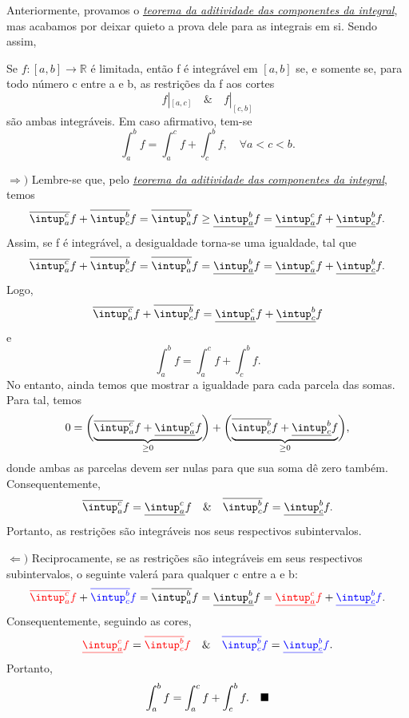 \documentclass[../analysisII_notes.tex]{subfiles}
\begin{document}
Anteriormente, provamos o \hyperlink{integral_additivity}{\textit{teorema da aditividade das componentes da integral}}, mas acabamos por deixar quieto a prova dele para as integrais em si. Sendo assim,
\begin{theorem*}
	Se \(f:[a, b]\rightarrow \mathbb{R}\) é limitada, então f é integrável em \([a, b]\) se, e somente se, para todo número c entre a e b, as restrições da f aos cortes
	\[
		f|_{[a, c]} \quad\&\quad f|_{[c, b]}
	\]
	são ambas integráveis. Em caso afirmativo, tem-se
	\[
		\int_{a}^{b} f = \int_{a}^{c} f + \int_{c}^{b}f,\quad \forall a < c < b.
	\]
\end{theorem*}
\begin{proof*}
	\(\Rightarrow )\) Lembre-se que, pelo \hyperlink{integral_additivity}{\textit{teorema da aditividade das componentes da integral}}, temos
	\[
		\overline{\intup_{a}^{c}}f + \overline{\intup_{c}^{b}}f = \overline{\intup_{a}^{b}}f \geq \underline{\intup_{a}^{b}}f = \underline{\intup_{a}^{c}}f +\underline{\intup_{c}^{b}}f.
	\]
	Assim, se f é integrável, a desigualdade torna-se uma igualdade, tal que
	\[
		\overline{\intup_{a}^{c}}f + \overline{\intup_{c}^{b}}f = \overline{\intup_{a}^{b}}f = \underline{\intup_{a}^{b}}f = \underline{\intup_{a}^{c}}f +\underline{\intup_{c}^{b}}f.
	\]
	Logo,
	\[
		\overline{\intup_{a}^{c}}f + \overline{\intup_{c}^{b}}f = \underline{\intup_{a}^{c}}f +\underline{\intup_{c}^{b}}f
	\]
	e
	\[
		\int_{a}^{b} f = \int_{a}^{c} f + \int_{c}^{b} f.
	\]
	No entanto, ainda temos que mostrar a igualdade para cada parcela das somas. Para tal, temos
	\[
		0 = \biggl(\underbrace{\overline{\intup_{a}^{c}}f + \underline{\intup_{a}^{c}}f}_{\geq 0}\biggr) + \biggl(\underbrace{\overline{\intup_{c}^{b}}f + \underline{\intup_{c}^{b}} f}_{\geq 0}\biggr),
	\]
	donde ambas as parcelas devem ser nulas para que sua soma dê zero também. Consequentemente,
	\[
		\overline{\intup_{a}^{c}} f = \underline{\intup_{a}^{c}} f \quad\&\quad \overline{\intup_{c}^{b}}f = \underline{\intup_{c}^{b}}f.
	\]
	Portanto, as restrições são integráveis nos seus respectivos subintervalos.

	\(\Leftarrow )\) Reciprocamente, se as restrições são integráveis em seus respectivos subintervalos, o seguinte valerá para qualquer c entre a e b:
	\[
		{\color{red}\overline{\intup_{a}^{c}}f} + {\color{blue}\overline{\intup_{c}^{b}}f} = \overline{\intup_{a}^{b}}f =\underline{\intup_{a}^{b}}f = {\color{red}\underline{\intup_{a}^{c}}f} +{\color{blue} \underline{\intup_{c}^{b}}f}.
	\]
	Consequentemente, seguindo as cores,
	\[
		{\color{red}\underline{\intup_{a}^{c}}f} = {\color{red}\overline{\intup_{c}^{b}}f} \quad\&\quad {\color{blue}\overline{\intup_{c}^{b}}f} = {\color{blue}\underline{\intup_{c}^{b}}f}.
	\]
	Portanto,
	\[
		\int_{a}^{b}f = \int_{a}^{c} f + \int_{c}^{b}f.\quad \text{$\blacksquare$}
	\]
\end{proof*}
\end{document}
